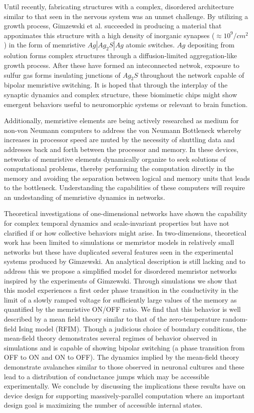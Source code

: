\documentclass[aps,prl,preprint,groupedaddress]{revtex4-1}
\begin{document}
Until recently, fabricating structures with a complex, disordered architecture
similar to that seen in the nervous system was an unmet challenge.  By
utilizing a growth process, Gimzewski et al. succeeded in producing a material
that appoximates this structure with a high density of inorganic synapses
($\approx 10^9 /cm^2$) in the form of memristive $Ag|Ag_2 S|Ag$ atomic
 switches.  $Ag$ depositing from solution forms complex structures through a
diffusion-limited aggregation-like growth process.  After these have formed
an inteconnected netwok, exposure to sulfur gas forms insulating junctions
of $Ag_2 S$ throughout the network capable of bipolar memristive switching.
It is hoped that through the interplay of the synaptic dynamics and complex
structure, these biomimetic chips might show emergent behaviors useful to
neuromorphic systems or relevant to brain function.

Additionally, memristive elements are being actively researched as medium for
non-von Neumann computers to address the von Neumann Bottleneck
\cite{Backus1978} whereby increases in processor speed are muted by the
necessity of shuttling data and addresses back and forth between the
processor and memory.  In these devices, networks of memristive elements
dynamically organize to seek solutions of computational problems, thereby
performing the computation directly in the memory and avoiding the separation
between logical and memory units that leads to the bottleneck.  Understanding
the capabilities of these computers will require an undestanding of memristive
dynamics in networks.

Theoretical investigations of one-dimensional networks have shown the
capability for complex temporal dynamics and scale-invariant properties but
have not clarified if or how collective behaviors might arise.  In
two-dimensions, theoretical work has been limited to simulations or memristor
models in relatively small networks but these have duplicated several features
seen in the experimental systems produced by Gimzewski.  An analytical
description is still lacking and to address this we propose a simplified model
for disordered memristor networks inspired by the experiments of Gimzewski.
Through simulations we show that this model experiences a first order phase
transition in the conductivity in the limit of a slowly ramped voltage for
sufficiently large values of the memory as quantified by the memristive ON/OFF
ratio.  We find that this behavior is well described by a mean field theory
similar to that of the zero-temperature random-field Ising model (RFIM).
Though a judicious choice of boundary conditions, the mean-field theory
demonstrates several regimes of behavior observed in simulations and is
capable of showing bipolar switching (a phase transition from OFF to ON and
ON to OFF).  The dynamics implied by the mean-field theory demonstrate
avalanches similar to those observed in neuronal cultures and these lead
to a distribution of conductance jumps which may be accessible experimentally.
We conclude by discussing the implications these results have on device design
for supporting massively-parallel computation where an important design
goal is maximizing the number of accessible internal states.
\end{document}
